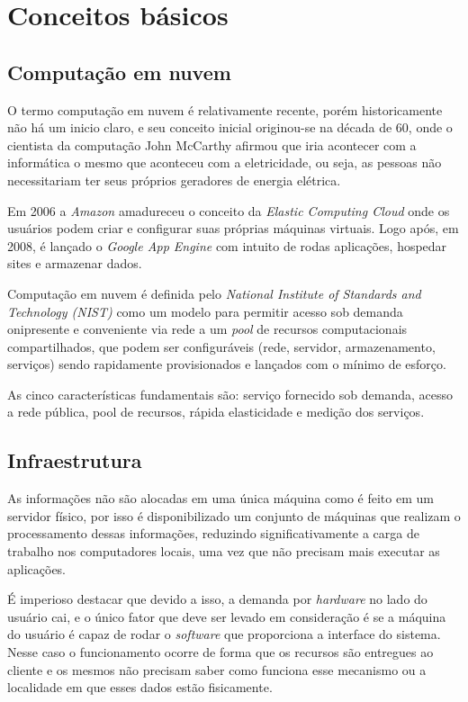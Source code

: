\documentclass[12pt]{article}
\begin{document}
\section{Conceitos básicos}

\subsection{Computação em nuvem}

O termo computação em nuvem é relativamente recente, porém historicamente não há um inicio claro, e seu conceito inicial originou-se na década de 60, onde o cientista da computação John McCarthy afirmou que iria acontecer com a informática o mesmo que aconteceu com a eletricidade, ou seja, as pessoas não necessitariam ter seus próprios geradores de energia elétrica.

Em 2006 a \emph{Amazon} amadureceu o conceito da \emph{Elastic Computing Cloud} onde os usuários podem criar e configurar suas próprias máquinas virtuais. Logo após, em 2008, é lançado o \emph{Google App Engine} com intuito de rodas aplicações, hospedar sites e armazenar dados.

Computação em nuvem é definida pelo \emph{National Institute of Standards and Technology (NIST)} como um modelo para permitir acesso sob demanda onipresente e conveniente via rede a um \emph{pool} de recursos computacionais compartilhados, que podem ser configuráveis (rede, servidor, armazenamento, serviços) sendo rapidamente provisionados e lançados com o mínimo de esforço.

As cinco características fundamentais são: serviço fornecido sob demanda, acesso a rede pública, pool de recursos, rápida elasticidade e medição dos serviços.
\subsection{Infraestrutura}

As informações não são alocadas em uma única máquina como é feito em um servidor físico, por isso é disponibilizado um conjunto de máquinas que realizam o processamento dessas informações, reduzindo significativamente a carga de trabalho nos computadores locais, uma vez que não precisam mais executar as aplicações.

É imperioso destacar que devido a isso, a demanda por \emph{hardware} no lado do usuário cai, e o único fator que deve ser levado em consideração é se a máquina do usuário é capaz de rodar o \emph{software} que proporciona a interface do sistema. Nesse caso o funcionamento ocorre de forma que os recursos são entregues ao cliente e os mesmos não precisam saber como funciona esse mecanismo ou a localidade em que esses dados estão fisicamente.
\end{document}
